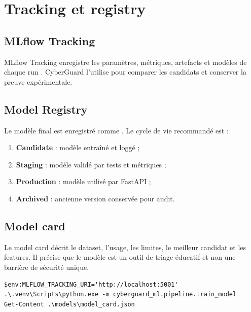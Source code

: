 \chapter{Tracking et registry}

\section{MLflow Tracking}
MLflow Tracking enregistre les paramètres, métriques, artefacts et modèles de chaque run \cite{mlflow_tracking}. CyberGuard l'utilise pour comparer les candidats et conserver la preuve expérimentale.


\section{Model Registry}
Le modèle final est enregistré comme . Le cycle de vie recommandé est :
\begin{enumerate}
  \item \textbf{Candidate} : modèle entraîné et loggé ;
  \item \textbf{Staging} : modèle validé par tests et métriques ;
  \item \textbf{Production} : modèle utilisé par FastAPI ;
  \item \textbf{Archived} : ancienne version conservée pour audit.
\end{enumerate}

\section{Model card}
Le model card décrit le dataset, l'usage, les limites, le meilleur candidat et les features. Il précise que le modèle est un outil de triage éducatif et non une barrière de sécurité unique.

\begin{lstlisting}
$env:MLFLOW_TRACKING_URI='http://localhost:5001'
.\.venv\Scripts\python.exe -m cyberguard_ml.pipeline.train_model
Get-Content .\models\model_card.json
\end{lstlisting}
